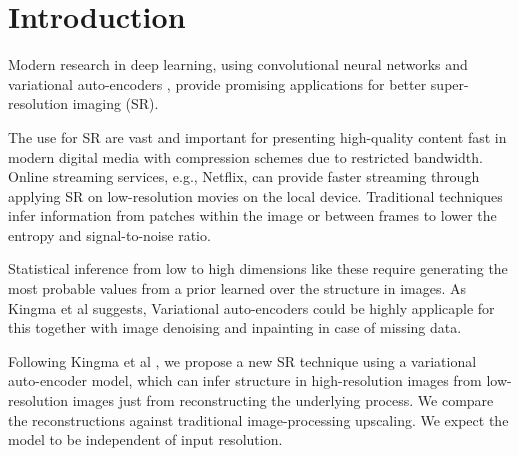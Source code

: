 \section{Introduction}
\label{sec:introduction}


Modern research in deep learning, using convolutional neural networks \cite{Dong15} and variational auto-encoders \cite{Kingma2013, Johnson16}, provide promising applications for better super-resolution imaging (SR).

The use for SR are vast and important for presenting high-quality content fast in modern digital media with compression schemes due to restricted bandwidth. Online streaming services, e.g., Netflix, can provide faster streaming through applying SR on low-resolution movies on the local device. Traditional techniques infer information from patches within the image or between frames to lower the entropy and signal-to-noise ratio. 


Statistical inference from low to high dimensions like these require generating the most probable values from a prior learned over the structure in images. As Kingma et al \cite{Kingma2013} suggests, Variational auto-encoders could be highly applicaple for this together with image denoising and inpainting in case of missing data.

Following Kingma et al \cite{Kingma2013}, we propose a new SR technique using a variational auto-encoder model, which can infer structure in high-resolution images from low-resolution images just from reconstructing the underlying process. We compare the reconstructions against traditional image-processing upscaling. We expect the model to be independent of input resolution.
